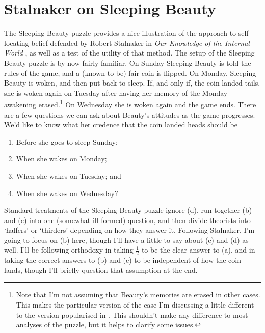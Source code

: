 \chapter{Stalnaker on Sleeping Beauty}


The Sleeping Beauty puzzle provides a nice illustration of the approach to self\hyp{}locating belief defended by Robert Stalnaker in \textit{Our Knowledge of the Internal World} \citep{Stalnaker2008}, as well as a test of the utility of that method. The setup of the Sleeping Beauty puzzle is by now fairly familiar. On Sunday Sleeping Beauty is told the rules of the game, and a (known to be) fair coin is flipped. On Monday, Sleeping Beauty is woken, and then put back to sleep. If, and only if, the coin landed tails, she is woken again on Tuesday after having her memory of the Monday awakening erased.\footnote{Note that I'm not assuming that Beauty's memories are erased in other cases. This makes the particular version of the case I'm discussing a little different to the version popularised in \citet{Elga2000}. This shouldn't make any difference to most analyses of the puzzle, but it helps to clarify some issues.} On Wednesday she is woken again and the game ends. There are a few questions we can ask about Beauty's attitudes as the game progresses. We'd like to know what her credence that the coin landed heads should be
\begin{enumerate}
\renewcommand{\labelenumi}{(\alph{enumi})}\item Before she goes to sleep Sunday;
\item When she wakes on Monday;
\item When she wakes on Tuesday; and
\item When she wakes on Wednesday?
\end{enumerate}
\noindent Standard treatments of the Sleeping Beauty puzzle ignore (d), run together (b) and (c) into one (somewhat ill-formed) question, and then divide theorists into `halfers' or `thirders' depending on how they answer it. Following Stalnaker, I'm going to focus on (b) here, though I'll have a little to say about (c) and (d) as well. I'll be following orthodoxy in taking \(\frac{1}{2}\) to be the clear answer to (a), and in taking the correct answers to (b) and (c) to be independent of how the coin lands, though I'll briefly question that assumption at the end.

